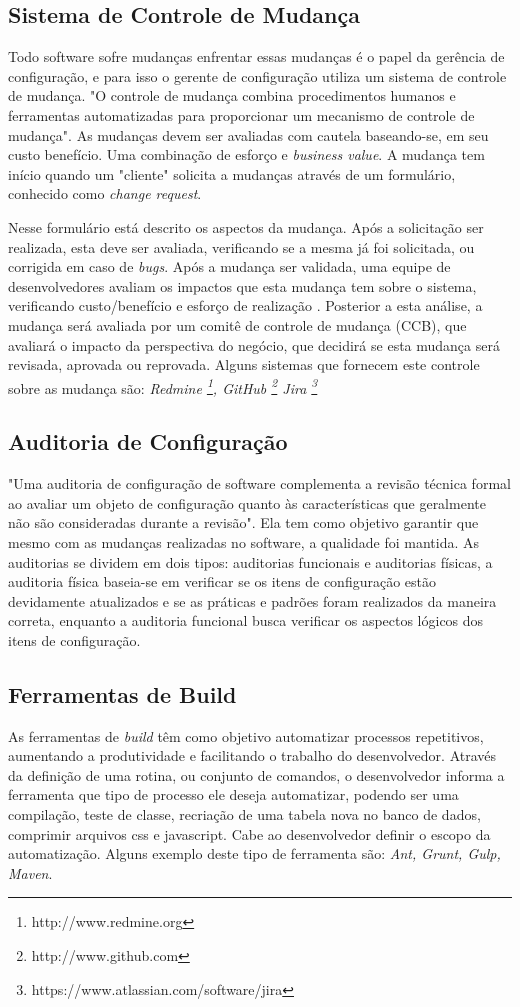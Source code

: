 \subsection{Sistema de Controle de Mudança}
Todo software sofre mudanças enfrentar essas mudanças é o papel da gerência de configuração, e para isso o gerente de configuração utiliza um sistema de controle de mudança. "O controle de mudança combina procedimentos humanos e ferramentas automatizadas para proporcionar um mecanismo de controle de mudança"\space {}. As mudanças devem ser avaliadas com cautela baseando-se, em seu custo benefício. Uma combinação de esforço e \textit{business value}. A mudança tem início quando um "cliente" solicita a mudanças através de um formulário, conhecido como \textit{change request}.

 Nesse formulário está descrito os aspectos da mudança. Após a solicitação ser realizada, esta deve ser avaliada, verificando se a mesma já foi solicitada, ou corrigida em caso de \textit{bugs}. Após a mudança ser validada, uma equipe de desenvolvedores avaliam os impactos que esta mudança tem sobre o sistema, verificando custo/benefício e esforço de realização \cite{sommerville2011}. Posterior a esta análise, a mudança será avaliada por um comitê de controle de mudança (CCB), que avaliará o impacto da perspectiva do negócio, que decidirá se esta mudança será revisada, aprovada ou reprovada. Alguns sistemas que fornecem este controle sobre as mudança são: \textit{Redmine \footnote{http://www.redmine.org}, GitHub \footnote{http://www.github.com} Jira \footnote{https://www.atlassian.com/software/jira}}
\subsection{Auditoria de Configuração}
"Uma auditoria de configuração de software complementa a revisão técnica formal ao avaliar um objeto de configuração quanto às características que geralmente não são consideradas durante a revisão"\space{}. Ela tem como objetivo garantir que mesmo com as mudanças realizadas no software, a qualidade foi mantida. As auditorias se dividem em dois tipos: auditorias funcionais e auditorias físicas, a auditoria física baseia-se em verificar se os itens de configuração estão devidamente atualizados e se as práticas e padrões foram realizados da maneira correta, enquanto a auditoria funcional busca verificar os aspectos lógicos dos itens de configuração.
\subsection{Ferramentas de Build}
As ferramentas de \textit{build} têm como objetivo automatizar processos repetitivos, aumentando a produtividade e facilitando o trabalho do desenvolvedor. Através da definição de uma rotina, ou conjunto de comandos, o desenvolvedor informa a ferramenta que tipo de processo ele deseja automatizar, podendo ser uma compilação, teste de classe, recriação de uma tabela nova no banco de dados, comprimir arquivos css e javascript. Cabe ao desenvolvedor definir o escopo da automatização. Alguns exemplo deste tipo de ferramenta são: \textit{Ant, Grunt, Gulp, Maven}.


